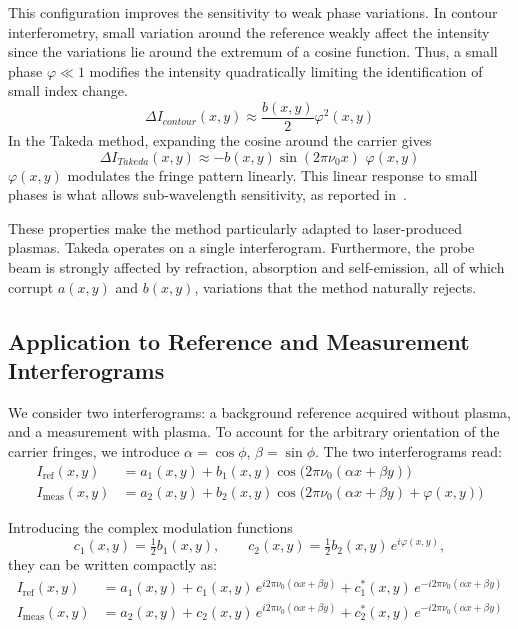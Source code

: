 \documentclass[11pt,a4paper]{article}
\begin{document}
This configuration improves the sensitivity to weak phase variations. In contour interferometry, small variation around the reference weakly affect the intensity since the variations lie around the extremum of a cosine function. Thus, a small phase $\varphi \ll 1$ modifies the intensity quadratically limiting the identification of small index change.
$$
\Delta I_{contour}(x,y) \approx  \frac{b(x,y)}{2}\varphi^2(x,y)
$$
In the Takeda method, expanding the cosine around the carrier gives
$$
\Delta I_{Takeda}(x,y)  \approx -b(x,y)\sin{(2\pi\nu_0 x)}\,\,\varphi(x,y)
$$ 
$\varphi(x,y)$ modulates the fringe pattern linearly. This linear response to small phases is what allows sub-wavelength sensitivity, as reported in~\cite{takeda1982fourier}.

These properties make the method particularly adapted to laser-produced plasmas. Takeda operates on a single interferogram. Furthermore, the probe beam is strongly affected by refraction, absorption and self-emission, all of which corrupt $a(x,y)$ and $b(x,y)$, variations that the method naturally rejects.

\subsection{Application to Reference and Measurement Interferograms}

We consider two interferograms: a background reference acquired without plasma, and a measurement with plasma. To account for the arbitrary orientation of the carrier fringes, we introduce $\alpha = \cos\phi$, $\beta = \sin\phi$. The two interferograms read:
\begin{align}
I_{\text{ref}}(x,y)  &= a_1(x,y) + b_1(x,y)\cos\!\big(2\pi\nu_0 (\alpha x + \beta y)\big) \\
I_{\text{meas}}(x,y) &= a_2(x,y) + b_2(x,y)\cos\!\big(2\pi\nu_0 (\alpha x + \beta y) + \varphi(x,y)\big)
\end{align}

Introducing the complex modulation functions
\begin{equation}
c_1(x,y) = \tfrac{1}{2}b_1(x,y), \qquad c_2(x,y) = \tfrac{1}{2}b_2(x,y)\,e^{i\varphi(x,y)},
\end{equation}
they can be written compactly as:
\begin{align}
I_{\text{ref}}(x,y)  &= a_1(x,y) + c_1(x,y)\,e^{i2\pi\nu_0(\alpha x+\beta y)} + c_1^*(x,y)\,e^{-i2\pi\nu_0(\alpha x+\beta y)} \\
I_{\text{meas}}(x,y) &= a_2(x,y) + c_2(x,y)\,e^{i2\pi\nu_0(\alpha x+\beta y)} + c_2^*(x,y)\,e^{-i2\pi\nu_0(\alpha x+\beta y)}
\end{align}
\end{document}

